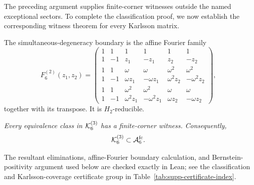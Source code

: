 The preceding argument supplies finite-corner witnesses outside the named exceptional sectors. To complete the classification proof, we now establish the corresponding witness theorem for every Karlsson matrix.

The simultaneous-degeneracy boundary is the affine Fourier family
\begin{equation}
F_6^{(2)}(z_1,z_2)=
\begin{pmatrix}
1&1&1&1&1&1\\
1&-1&z_1&-z_1&z_2&-z_2\\
1&1&\omega&\omega&\omega^2&\omega^2\\
1&-1&\omega z_1&-\omega z_1&\omega^2z_2&-\omega^2z_2\\
1&1&\omega^2&\omega^2&\omega&\omega\\
1&-1&\omega^2z_1&-\omega^2z_1&\omega z_2&-\omega z_2
\end{pmatrix},
\label{eq:supp-fourier-family}
\end{equation}
together with its transpose. It is $H_2$-reducible.

{\emph{Every equivalence class in $\mathcal K_6^{(3)}$ has a finite-corner witness. Consequently,}}
\begin{equation}
{\mathcal K_6^{(3)}\subset\mathcal A_6^{\mathrm{fc}}.}
\label{eq:supp-full-karlsson-containment}
\end{equation}

{The resultant eliminations, affine-Fourier boundary calculation, and Bernstein-positivity argument used below are checked exactly in Lean; see the classification and Karlsson-coverage certificate group in Table~\ref{tab:supp-certificate-index}.}

